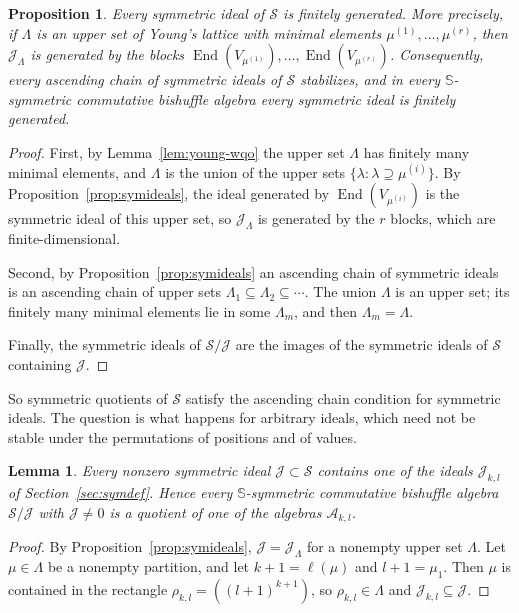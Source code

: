 \documentclass[11pt]{amsart}
\newtheorem{proposition}[theorem]{Proposition}
\newtheorem{lemma}[theorem]{Lemma}
\theoremstyle{definition}
\theoremstyle{remark}
\newcommand{\bS}{\mathbb{S}}
\newcommand{\cA}{\mathscr{A}}
\newcommand{\cJ}{\mathscr{J}}
\newcommand{\cS}{\mathscr{S}}
\newcommand{\End}{\operatorname{End}}
\begin{document}
\begin{proposition}\label{prop:sym-noeth}
	Every symmetric ideal of $\cS$ is finitely generated. More precisely, if $\Lambda$ is an upper set of Young's lattice with minimal elements $\mu^{(1)},\dots,\mu^{(r)}$, then $\cJ_\Lambda$ is generated by the blocks $\End(V_{\mu^{(1)}}),\dots,\End(V_{\mu^{(r)}})$. Consequently, every ascending chain of symmetric ideals of $\cS$ stabilizes, and in every $\bS$-symmetric commutative bishuffle algebra every symmetric ideal is finitely generated.
\end{proposition}

\begin{proof}
	First, by Lemma~\ref{lem:young-wqo} the upper set $\Lambda$ has finitely many minimal elements, and $\Lambda$ is the union of the upper sets $\{\lambda:\lambda\supseteq\mu^{(i)}\}$. By Proposition~\ref{prop:symideals}, the ideal generated by $\End(V_{\mu^{(i)}})$ is the symmetric ideal of this upper set, so $\cJ_\Lambda$ is generated by the $r$ blocks, which are finite-dimensional.
	
	Second, by Proposition~\ref{prop:symideals} an ascending chain of symmetric ideals is an ascending chain of upper sets $\Lambda_1\subseteq\Lambda_2\subseteq\cdots$. The union $\Lambda$ is an upper set; its finitely many minimal elements lie in some $\Lambda_m$, and then $\Lambda_m=\Lambda$.
	
	Finally, the symmetric ideals of $\cS/\cJ$ are the images of the symmetric ideals of $\cS$ containing $\cJ$.
\end{proof}

So symmetric quotients of $\cS$ satisfy the ascending chain condition for symmetric ideals. The question is what happens for arbitrary ideals, which need not be stable under the permutations of positions and of values.





\begin{lemma}\label{lem:sym-in-hook}
Every nonzero symmetric ideal $\cJ\subset\cS$ contains one of the ideals $\cJ_{k,l}$ of Section~\ref{sec:symdef}. Hence every $\bS$-symmetric commutative bishuffle algebra $\cS/\cJ$ with $\cJ\ne0$ is a quotient of one of the algebras $\cA_{k,l}$.
\end{lemma}

\begin{proof}
By Proposition~\ref{prop:symideals}, $\cJ=\cJ_\Lambda$ for a nonempty upper set $\Lambda$. Let $\mu\in\Lambda$ be a nonempty partition, and let $k+1=\ell(\mu)$ and $l+1=\mu_1$. Then $\mu$ is contained in the rectangle $\rho_{k,l}=((l+1)^{k+1})$, so $\rho_{k,l}\in\Lambda$ and $\cJ_{k,l}\subseteq\cJ$.
\end{proof}
\end{document}
